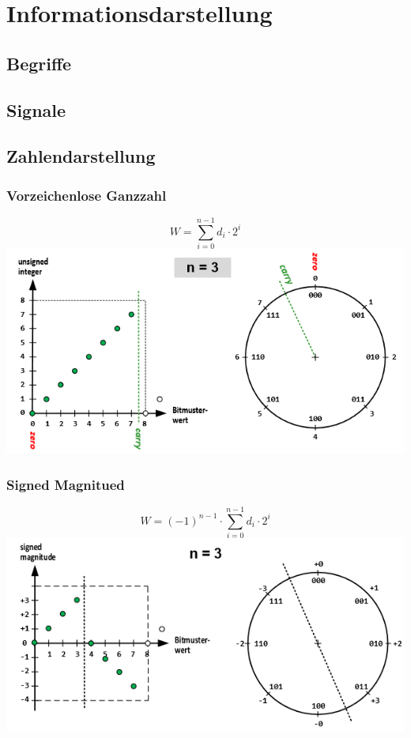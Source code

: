 \section{Informationsdarstellung}
\subsection{Begriffe}

\subsection{Signale}

\subsection{Zahlendarstellung}
\subsubsection{Vorzeichenlose Ganzzahl}
\[W = \sum_{i=0}^{n-1}d_i\cdot 2^i\]
\includegraphics[width=\linewidth]{Images/ganzzahl}


\subsubsection{Signed Magnitued}
\[W = (-1)^{n-1} \cdot \sum_{i=0}^{n-1}d_i\cdot 2^i\]
\includegraphics[width=\linewidth]{Images/signedmagnetude}

